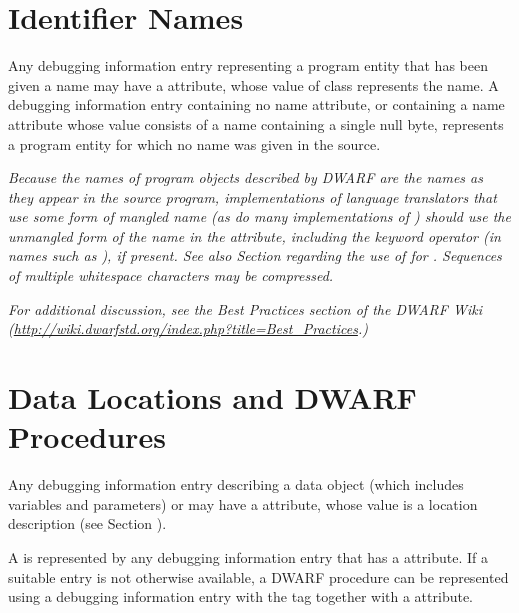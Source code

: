\section{Identifier Names}
\label{chap:identifiernames}
Any\hypertarget{chap:DWATnamenameofdeclaration}{}
debugging information entry 
representing 
a program entity that has been given a name may have a 
\DWATnameDEFN{} 
attribute, whose value of 
class \CLASSstring{} represents the name.
A debugging information entry containing
no name attribute, or containing a name attribute whose value
consists of a name containing a single null byte, represents
a program entity for which no name was given in the source.

\textit{Because the names of program objects described by DWARF are 
the names as they appear in the source program, implementations
of language translators that use some form of mangled name
(as do many implementations of ) should use the 
unmangled form of the name in the 
\DWATname{} attribute,
including the keyword operator (in names such as ),
if present. See also 
Section  regarding the use of 
\DWATlinkagename{} for 
.
Sequences of multiple whitespace characters may be compressed.}

\textit{For additional discussion, see the Best Practices section 
of the DWARF Wiki 
(\url{http://wiki.dwarfstd.org/index.php?title=Best_Practices}.)}

\section{Data Locations and DWARF Procedures}
\hypertarget{chap:DWATlocationdataobjectlocation}{}
Any debugging information entry describing a data object (which
includes variables and parameters) or 
may have a \DWATlocationDEFN{} attribute,
whose value is a location description
(see Section ).

A  is represented by any
debugging information entry that has a
\DWATlocationNAME{} attribute.
If a suitable entry is not otherwise available,
a DWARF procedure can be represented using a debugging
information entry 
with the tag \DWTAGdwarfprocedureTARG{} together with a 
\DWATlocationNAME{} attribute.  

